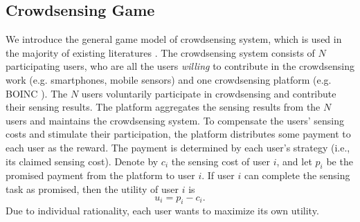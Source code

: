 \documentclass[conference]{IEEEtran}
\theoremstyle{definition}
\begin{document}
\subsection{Crowdsensing Game}
\label{subsec:CG}
{
We introduce the general game model of crowdsensing system, which is used in the majority of existing literatures \cite{yang2012crowdsourcing,koutsopoulos2013optimal,luo2014profit,zhang2014free,liu2014social,yan2015ifc}. The crowdsensing system consists of $N$ participating users, who are all the users \emph{willing} to contribute in the crowdsensing work (e.g. smartphones, mobile sensors) and one crowdsensing platform (e.g. BOINC \cite{anderson2004boinc}). The $N$ users voluntarily participate in crowdsensing and contribute their sensing results. The platform aggregates the sensing results from the $N$ users and maintains the crowdsensing system. %
To compensate the users' sensing costs and stimulate their participation, the platform distributes some payment to each user as the reward. The payment is determined by each user's strategy (i.e., its claimed sensing cost). Denote by $c_i$ the sensing cost of user $i$, and let $p_i$ be the promised payment from the platform to user $i$. If user $i$ can complete the sensing task as promised, then the utility of user $i$ is
\begin{equation}
\label{eqn:user_utility_1}
u_i = p_i-c_i.
\end{equation}
Due to individual rationality, each user wants to maximize its own utility. %

}
\end{document}
